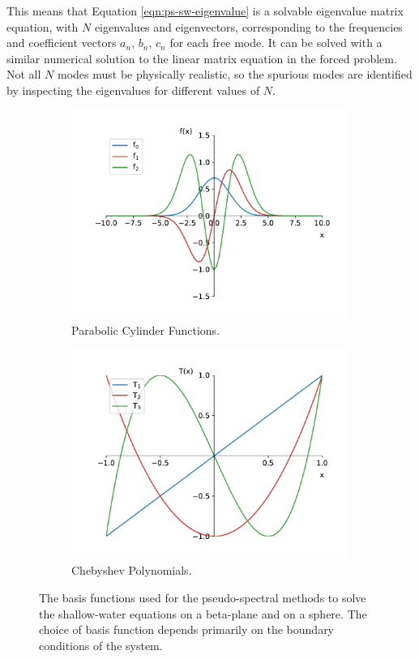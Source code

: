 This means that Equation \ref{eqn:ps-sw-eigenvalue} is a solvable eigenvalue matrix equation, with $N$ eigenvalues and eigenvectors, corresponding to the frequencies and coefficient vectors $a_{n}$, $b_{n}$, $c_{n}$ for each free mode. It can be solved with a similar numerical solution to the linear matrix equation in the forced problem. Not all $N$ modes must be physically realistic, so the spurious modes are identified by inspecting the eigenvalues for different values of $N$.


\begin{figure}
  \centering
  \begin{subfigure}[b]{0.48\textwidth}
    \includegraphics[width=\textwidth]{figures/appendices/herm_polys.pdf}
    \caption{Parabolic Cylinder Functions.}\label{fig:hermite-functions}
  \end{subfigure}
  \quad
  \begin{subfigure}[b]{0.48\textwidth}
    \includegraphics[width=\textwidth]{figures/appendices/cheb_polys.pdf}
    \caption{Chebyshev Polynomials.}\label{fig:chebyshev-polynomials}
  \end{subfigure}
\caption{The basis functions used for the pseudo-spectral methods to solve the shallow-water equations on a beta-plane and on a sphere. The choice of basis function depends primarily on the boundary conditions of the system.}\label{fig:basis-functions}
\end{figure}
